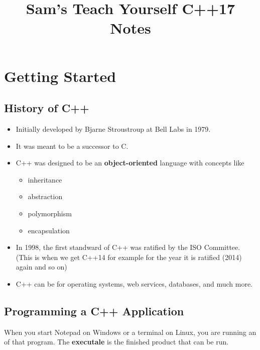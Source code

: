 \documentclass[10pt]{article}
\title{Sam's Teach Yourself C++17 Notes}
\author{}
\date{}
\newcommand{\vocab}[1]{\fbox{\textbf{\textit{#1}}}}
\begin{document}
\maketitle

\tableofcontents

\newpage
\section{Getting Started}

\subsection{History of C++}
\begin{itemize}
	\item Initially developed by Bjarne Stroustroup at Bell Labs in 1979.
	\item It was meant to be a successor to C.
	\item C++ was designed to be an \textbf{object-oriented} language with concepts like
	\begin{itemize}
		\item inheritance
		\item abstraction
		\item polymorphism
		\item encapsulation
	\end{itemize}
	\item In 1998, the first standward of C++ was ratified by the ISO Committee. \\ (This is when we get C++14 for example for the year it is ratified (2014) again and so on)
	\item C++ can be for operating systems, web services, databases, and much more.
\end{itemize}

\newpage
\subsection{Programming a C++ Application}
When you start Notepad on Windows or a terminal on Linux, you are running an \vocab{executable} of that program. The \textbf{executale} is the finished product that can be run.
\end{document}
